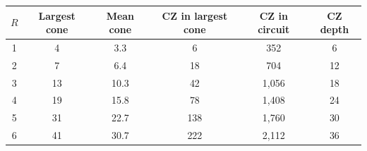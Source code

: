 \begin{tabular}{cccccc}
\toprule
$R$ & Largest cone & Mean cone & CZ in largest cone & CZ in circuit & CZ depth \\
\midrule
1 & 4 & 3.3 & 6 & 352 & 6 \\
2 & 7 & 6.4 & 18 & 704 & 12 \\
3 & 13 & 10.3 & 42 & 1,056 & 18 \\
4 & 19 & 15.8 & 78 & 1,408 & 24 \\
5 & 31 & 22.7 & 138 & 1,760 & 30 \\
6 & 41 & 30.7 & 222 & 2,112 & 36 \\
\bottomrule
\end{tabular}
